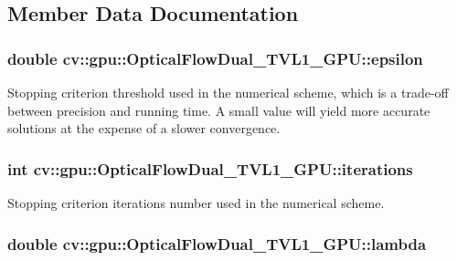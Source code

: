 \subsection{Member Data Documentation}
\hypertarget{classcv_1_1gpu_1_1OpticalFlowDual__TVL1__GPU_a16f4286555465d7da1fb29842f34443b}{
\subsubsection[{epsilon}]{\setlength{\rightskip}{0pt plus 5cm}double cv\-::gpu\-::\-Optical\-Flow\-Dual\-\_\-\-T\-V\-L1\-\_\-\-G\-P\-U\-::epsilon}}\label{classcv_1_1gpu_1_1OpticalFlowDual__TVL1__GPU_a16f4286555465d7da1fb29842f34443b}
Stopping criterion threshold used in the numerical scheme, which is a trade-\/off between precision and running time. A small value will yield more accurate solutions at the expense of a slower convergence. \hypertarget{classcv_1_1gpu_1_1OpticalFlowDual__TVL1__GPU_a27a4a49f41a1f438e9c6ba69dc13b645}{
\subsubsection[{iterations}]{\setlength{\rightskip}{0pt plus 5cm}int cv\-::gpu\-::\-Optical\-Flow\-Dual\-\_\-\-T\-V\-L1\-\_\-\-G\-P\-U\-::iterations}}\label{classcv_1_1gpu_1_1OpticalFlowDual__TVL1__GPU_a27a4a49f41a1f438e9c6ba69dc13b645}
Stopping criterion iterations number used in the numerical scheme. \hypertarget{classcv_1_1gpu_1_1OpticalFlowDual__TVL1__GPU_abedc407f2066391c89214e149f35eb82}{
\subsubsection[{lambda}]{\setlength{\rightskip}{0pt plus 5cm}double cv\-::gpu\-::\-Optical\-Flow\-Dual\-\_\-\-T\-V\-L1\-\_\-\-G\-P\-U\-::lambda}}\label{classcv_1_1gpu_1_1OpticalFlowDual__TVL1__GPU_abedc407f2066391c89214e149f35eb82}
